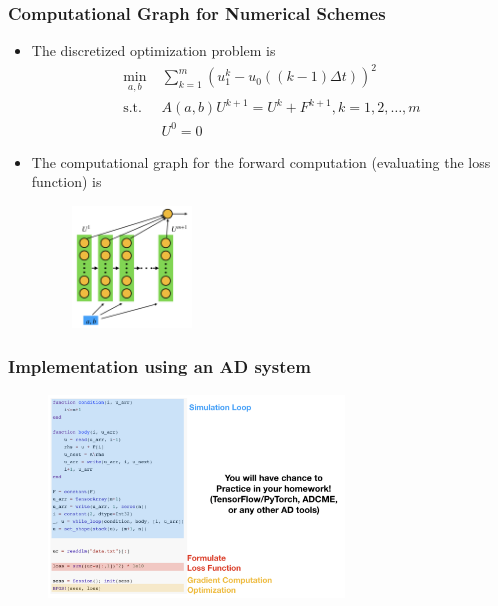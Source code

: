 \documentclass{beamer}
\begin{document}
\begin{frame}
	\frametitle{Computational Graph for Numerical Schemes}
	
	\begin{itemize}
		\item The discretized optimization problem is 
		\begin{align*}
			\min_{a, b}& \; \sum_{k=1}^m (u^k_1 - u_0( (k-1)\Delta t))^2\\
			\text{s.t.} & \; A(a,b)U^{k+1} = U^k + F^{k+1}, k = 1, 2,\ldots, m \\
			& \; U^0 = 0
		\end{align*}
		\item The computational graph for the forward computation (evaluating the loss function) is 
		\begin{figure}[hbt]
		\centering
  \includegraphics[width=0.3\textwidth]{figures/heatcg}
\end{figure}

	\end{itemize}
\end{frame}

\begin{frame}
	\frametitle{Implementation using an AD system}
	
	\begin{figure}[hbt]
  \includegraphics[width=0.7\textwidth]{figures/simulation}
\end{figure}

\end{frame}
\end{document}
